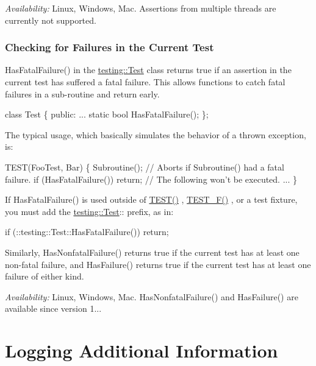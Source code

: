 {\itshape Availability\+:} Linux, Windows, Mac. Assertions from multiple threads are currently not supported.

\subsubsection*{Checking for Failures in the Current Test}

{\ttfamily Has\+Fatal\+Failure()} in the {\ttfamily \hyperlink{classtesting_1_1_test}{testing\+::\+Test}} class returns {\ttfamily true} if an assertion in the current test has suffered a fatal failure. This allows functions to catch fatal failures in a sub-\/routine and return early.


\begin{DoxyCode}
class Test \{
 public:
  ...
  static bool HasFatalFailure();
\};
\end{DoxyCode}


The typical usage, which basically simulates the behavior of a thrown exception, is\+:


\begin{DoxyCode}
TEST(FooTest, Bar) \{
  Subroutine();
  // Aborts if Subroutine() had a fatal failure.
  if (HasFatalFailure())
    return;
  // The following won't be executed.
  ...
\}
\end{DoxyCode}


If {\ttfamily Has\+Fatal\+Failure()} is used outside of {\ttfamily \hyperlink{gtest_8h_ad8b332753515c0ab8baada563c2547eb}{T\+E\+S\+T()}} , {\ttfamily \hyperlink{gtest_8h_a0ee66d464d1a06c20c1929cae09d8758}{T\+E\+S\+T\+\_\+\+F()}} , or a test fixture, you must add the {\ttfamily \hyperlink{classtesting_1_1_test}{testing\+::\+Test}\+:\+:} prefix, as in\+:


\begin{DoxyCode}
if (::testing::Test::HasFatalFailure())
  return;
\end{DoxyCode}


Similarly, {\ttfamily Has\+Nonfatal\+Failure()} returns {\ttfamily true} if the current test has at least one non-\/fatal failure, and {\ttfamily Has\+Failure()} returns {\ttfamily true} if the current test has at least one failure of either kind.

{\itshape Availability\+:} Linux, Windows, Mac. {\ttfamily Has\+Nonfatal\+Failure()} and {\ttfamily Has\+Failure()} are available since version 1...

\section*{Logging Additional Information}

